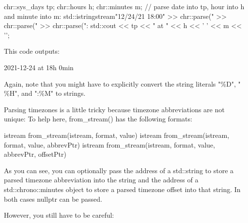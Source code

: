 \begin{cpp}
chr::sys_days tp;
chr::hours h;
chr::minutes m;
// parse date into tp, hour into h and minute into m:
std::istringstream{"12/24/21 18:00"} >> chr::parse("%
									 >> chr::parse(" %
									 >> chr::parse(":%
std::cout << tp << " at " << h << ' ' << m << '\n';
\end{cpp}

This code outputs:

\begin{shell}
2021-12-24 at 18h 0min
\end{shell}

Again, note that you might have to explicitly convert the string literals "\%D", " \%H", and ":\%M" to strings.


Parsing timezones is a little tricky because timezone abbreviations are not unique: To help here, from\_stream() has the following formats:

\begin{shell}
istream from_stream(istream, format, value)
istream from_stream(istream, format, value, abbrevPtr)
istream from_stream(istream, format, value, abbrevPtr, offsetPtr)
\end{shell}

As you can see, you can optionally pass the address of a std::string to store a parsed timezone abbreviation into the string and the address of a std::chrono::minutes object to store a parsed timezone offset into that string. In both cases nullptr can be passed.

However, you still have to be careful:

